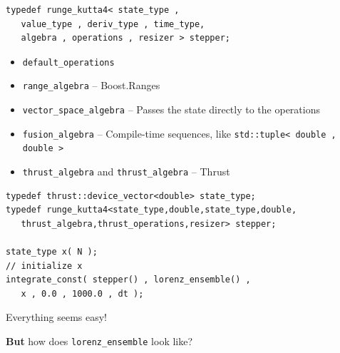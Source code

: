 \begin{frame}[fragile]


\begin{lstlisting}
typedef runge_kutta4< state_type ,
   value_type , deriv_type , time_type,
   algebra , operations , resizer > stepper; 
\end{lstlisting}

\begin{itemize}
 \item {\tt default\_operations}
 \item {\tt range\_algebra} -- Boost.Ranges
 \item {\tt vector\_space\_algebra} -- Passes the state directly to the operations
 \item {\tt fusion\_algebra} -- Compile-time sequences, like {\tt std::tuple< double , double >}
 \item {\tt thrust\_algebra} and {\tt thrust\_algebra} -- Thrust
\end{itemize}

 
\end{frame}



\begin{frame}[fragile]


 \begin{lstlisting}[basicstyle=\scriptsize\ttfamily]
typedef thrust::device_vector<double> state_type;
typedef runge_kutta4<state_type,double,state_type,double,
   thrust_algebra,thrust_operations,resizer> stepper; 

state_type x( N );
// initialize x
integrate_const( stepper() , lorenz_ensemble() ,
   x , 0.0 , 1000.0 , dt );
 \end{lstlisting}

\vspace{2ex}

\centerline{Everything seems easy!}
\vspace{2ex}
\centerline{{\bf But} how does {\tt lorenz\_ensemble} look like?}
 

\end{frame}




